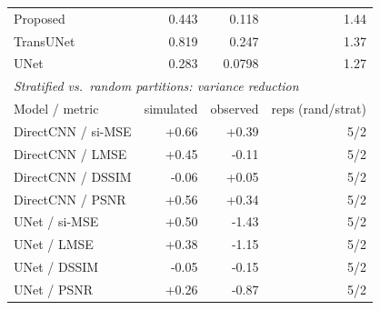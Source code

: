 \begin{table}[!htb]
\begin{tabular}{lrrr}
Proposed & 0.443 & 0.118 & 1.44 \\
TransUNet & 0.819 & 0.247 & 1.37 \\
UNet & 0.283 & 0.0798 & 1.27 \\
\midrule
\multicolumn{4}{l}{\textit{Stratified vs.\ random partitions: variance reduction}}\\
Model / metric & simulated & observed & reps (rand/strat) \\\midrule
DirectCNN / si-MSE & +0.66 & +0.39 & 5/2 \\
DirectCNN / LMSE & +0.45 & -0.11 & 5/2 \\
DirectCNN / DSSIM & -0.06 & +0.05 & 5/2 \\
DirectCNN / PSNR & +0.56 & +0.34 & 5/2 \\
UNet / si-MSE & +0.50 & -1.43 & 5/2 \\
UNet / LMSE & +0.38 & -1.15 & 5/2 \\
UNet / DSSIM & -0.05 & -0.15 & 5/2 \\
UNet / PSNR & +0.26 & -0.87 & 5/2 \\
\bottomrule\end{tabular}\end{table}
